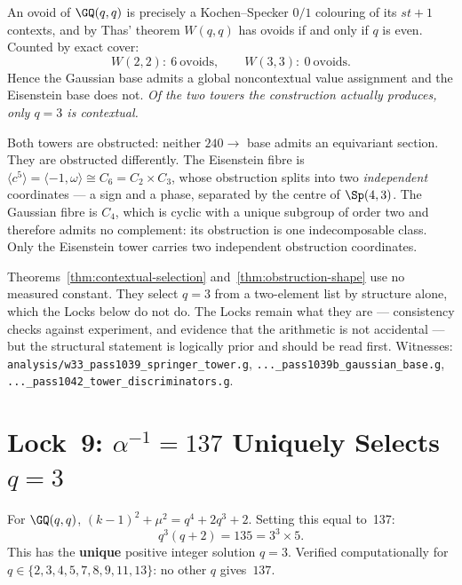 \begin{theorem}
\label{thm:contextual-selection}
An ovoid of $\GQ(q,q)$ is precisely a Kochen--Specker $0/1$ colouring of its
$st{+}1$ contexts, and by Thas' theorem $W(q,q)$ has ovoids if and only if $q$ is
even.  Counted by exact cover:
\[
W(2,2):\ 6\ \text{ovoids},\qquad W(3,3):\ 0\ \text{ovoids}.
\]
Hence the Gaussian base admits a global noncontextual value assignment and the
Eisenstein base does not.  \emph{Of the two towers the construction actually
produces, only $q=3$ is contextual.}
\end{theorem}

\begin{theorem}
\label{thm:obstruction-shape}
Both towers are obstructed: neither $240\to$ base admits an equivariant section.
They are obstructed differently.  The Eisenstein fibre is
$\langle c^5\rangle = \langle -1,\omega\rangle \cong C_6 = C_2\times C_3$, whose
obstruction splits into two \emph{independent} coordinates --- a sign and a phase,
separated by the centre of $\Sp(4,3)$.  The Gaussian fibre is $C_4$, which is
cyclic with a unique subgroup of order two and therefore admits no complement: its
obstruction is one indecomposable class.  Only the Eisenstein tower carries two
independent obstruction coordinates.
\end{theorem}

\begin{remark}
Theorems~\ref{thm:contextual-selection} and~\ref{thm:obstruction-shape} use no
measured constant.  They select $q=3$ from a two-element list by structure alone,
which the Locks below do not do.  The Locks remain what they are --- consistency
checks against experiment, and evidence that the arithmetic is not accidental ---
but the structural statement is logically prior and should be read first.
Witnesses: \texttt{analysis/w33\_pass1039\_springer\_tower.g},
\texttt{...\_pass1039b\_gaussian\_base.g},
\texttt{...\_pass1042\_tower\_discriminators.g}.
\end{remark}


\section{\texorpdfstring{Lock~9: $\alpha^{-1}=137$ Uniquely Selects $q=3$}{Lock 9: alpha-inverse equals 137 uniquely selects q=3}}

For $\GQ(q,q)$, $(k{-}1)^2+\mu^2 = q^4+2q^3+2$.
Setting this equal to~137:
\begin{equation}
\boxed{q^3(q+2) = 135 = 3^3\times 5.}
\end{equation}
This has the \textbf{unique} positive integer solution $q=3$.
Verified computationally for $q\in\{2,3,4,5,7,8,9,11,13\}$:
no other $q$ gives~$137$.

